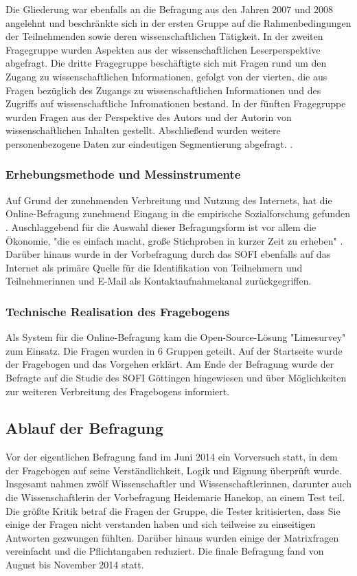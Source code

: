 Die Gliederung war ebenfalls an die Befragung aus den Jahren 2007 und 2008 angelehnt und beschränkte sich in der ersten Gruppe auf die Rahmenbedingungen der Teilnehmenden sowie deren wissenschaftlichen Tätigkeit. In der zweiten Fragegruppe wurden Aspekten aus der wissenschaftlichen Leserperspektive abgefragt. Die dritte Fragegruppe beschäftigte sich mit Fragen rund um den Zugang zu wissenschaftlichen Informationen, gefolgt von der vierten, die aus Fragen bezüglich des Zugangs zu wissenschaftlichen Informationen und des Zugriffs auf wissenschaftliche Infromationen bestand. In der fünften Fragegruppe wurden Fragen aus der Perspektive des Autors und der Autorin von wissenschaftlichen Inhalten gestellt. Abschließend wurden weitere personenbezogene Daten zur eindeutigen Segmentierung abgefragt. .

\subsubsection{Erhebungsmethode und Messinstrumente}

Auf Grund der zunehmenden Verbreitung und Nutzung des Internets, hat die Online-Befragung zunehmend Eingang in die empirische Sozialforschung gefunden \cite{Pannewitz_2002}. Auschlaggebend für die Auswahl dieser Befragungsform ist vor allem die Ökonomie, "die es einfach macht, große Stichproben in kurzer Zeit zu erheben" \cite{eichhorn_2004_online}. Darüber hinaus wurde in der Vorbefragung durch das SOFI ebenfalls auf das Internet als primäre Quelle für die Identifikation von Teilnehmern und Teilnehmerinnen und E-Mail als Kontaktaufnahmekanal zurückgegriffen.

\subsubsection{Technische Realisation des Fragebogens}

Als System für die Online-Befragung kam die Open-Source-Lösung "Limesurvey" zum Einsatz. Die Fragen wurden in 6 Gruppen geteilt. Auf der Startseite wurde der Fragebogen und das Vorgehen erklärt. Am Ende der Befragung wurde der Befragte auf die Studie des SOFI Göttingen hingewiesen und über Möglichkeiten zur weiteren Verbreitung des Fragebogens informiert.

\subsection{Ablauf der Befragung}
Vor der eigentlichen Befragung fand im Juni 2014 ein Vorversuch statt, in dem der Fragebogen auf seine Verständlichkeit, Logik und Eignung überprüft wurde. Insgesamt nahmen zwölf Wissenschaftler und Wissenschaftlerinnen, darunter auch die Wissenschaftlerin der Vorbefragung Heidemarie Hanekop, an einem Test teil. Die größte Kritik betraf die Fragen der Gruppe, die Tester kritisierten, dass Sie einige der Fragen nicht verstanden haben und sich teilweise zu einseitigen Antworten gezwungen fühlten. Darüber hinaus wurden einige der Matrixfragen vereinfacht und die Pflichtangaben reduziert. Die finale Befragung fand von August bis November 2014 statt.

